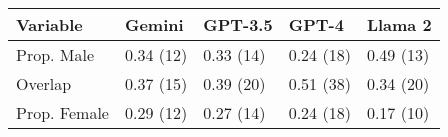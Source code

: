 
\begin{tabular}{lllll}
\toprule
Variable & Gemini & GPT-3.5 & GPT-4 & Llama 2\\
\midrule
Prop. Male & 0.34 (12) & 0.33 (14) & 0.24 (18) & 0.49 (13)\\
Overlap & 0.37 (15) & 0.39 (20) & 0.51 (38) & 0.34 (20)\\
Prop. Female & 0.29 (12) & 0.27 (14) & 0.24 (18) & 0.17 (10)\\
\bottomrule
\end{tabular}
